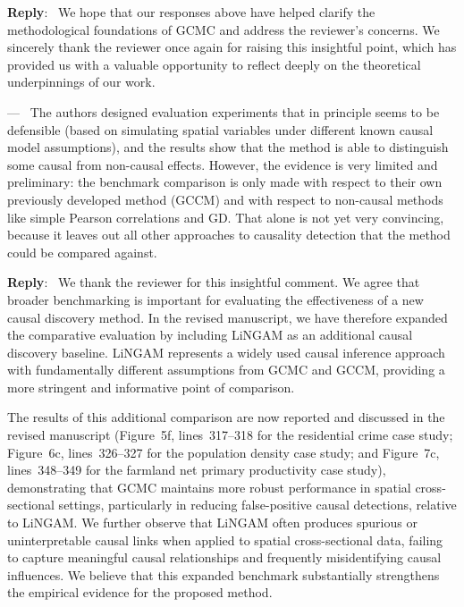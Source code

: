 \documentclass[11pt]{article}
\newcounter{reviewer}
\newcounter{point}[reviewer]
\renewcommand{\thepoint}{Comment\,\thereviewer.\arabic{point}}
\newenvironment{point}
   {\refstepcounter{point} \bigskip \noindent {\textbf{Reviewer~\thepoint} } ---\ }
   {\par }
\newenvironment{reply}
   {\medskip \noindent \color{blue} \begin{sf}\textbf{Reply}:\  }
   {\medskip \par \end{sf}}
\begin{document}
\begin{reply}
We hope that our responses above have helped clarify the methodological foundations of GCMC and address the reviewer’s concerns. We sincerely thank the reviewer once again for raising this insightful point, which has provided us with a valuable opportunity to reflect deeply on the theoretical underpinnings of our work.
\end{reply}

\begin{point}
The authors designed evaluation experiments that in principle seems to be defensible (based on simulating spatial variables under different known causal model assumptions), and the results show that the method is able to distinguish some causal from non-causal effects. However, the evidence is very limited and preliminary: the benchmark comparison is only made with respect to their own previously developed method (GCCM) and with respect to non-causal methods like simple Pearson correlations and GD. That alone is not yet very convincing, because it leaves out all other approaches to causality detection that the method could be compared against.
\end{point}

\begin{reply}
We thank the reviewer for this insightful comment. We agree that broader benchmarking is important for evaluating the effectiveness of a new causal discovery method. In the revised manuscript, we have therefore expanded the comparative evaluation by including LiNGAM as an additional causal discovery baseline. LiNGAM represents a widely used causal inference approach with fundamentally different assumptions from GCMC and GCCM, providing a more stringent and informative point of comparison.

The results of this additional comparison are now reported and discussed in the revised manuscript (Figure~5f, lines~317--318 for the residential crime case study; Figure~6c, lines~326--327 for the population density case study; and Figure~7c, lines~348--349 for the farmland net primary productivity case study), demonstrating that GCMC maintains more robust performance in spatial cross-sectional settings, particularly in reducing false-positive causal detections, relative to LiNGAM. We further observe that LiNGAM often produces spurious or uninterpretable causal links when applied to spatial cross-sectional data, failing to capture meaningful causal relationships and frequently misidentifying causal influences. We believe that this expanded benchmark substantially strengthens the empirical evidence for the proposed method.
\end{reply}
\end{document}
